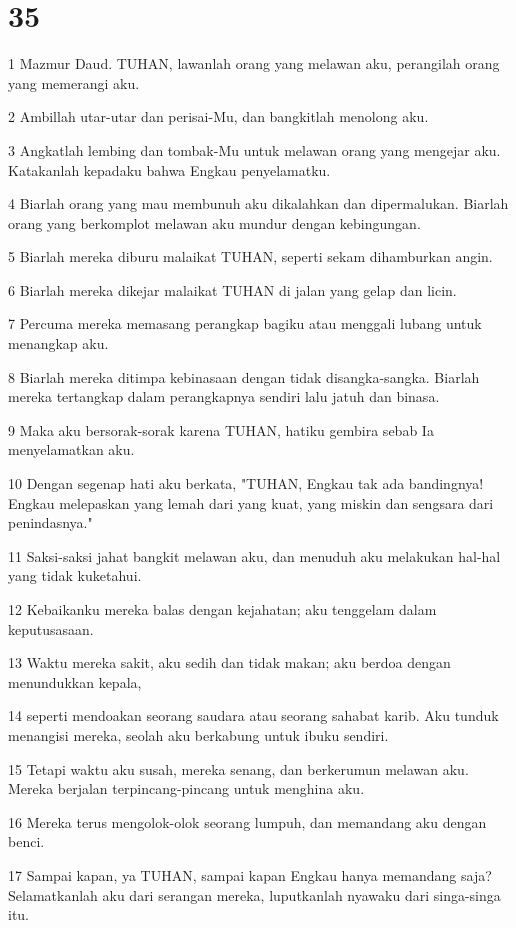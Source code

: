 \chapter{35}

\par 1 Mazmur Daud. TUHAN, lawanlah orang yang melawan aku, perangilah orang yang memerangi aku.
\par 2 Ambillah utar-utar dan perisai-Mu, dan bangkitlah menolong aku.
\par 3 Angkatlah lembing dan tombak-Mu untuk melawan orang yang mengejar aku. Katakanlah kepadaku bahwa Engkau penyelamatku.
\par 4 Biarlah orang yang mau membunuh aku dikalahkan dan dipermalukan. Biarlah orang yang berkomplot melawan aku mundur dengan kebingungan.
\par 5 Biarlah mereka diburu malaikat TUHAN, seperti sekam dihamburkan angin.
\par 6 Biarlah mereka dikejar malaikat TUHAN di jalan yang gelap dan licin.
\par 7 Percuma mereka memasang perangkap bagiku atau menggali lubang untuk menangkap aku.
\par 8 Biarlah mereka ditimpa kebinasaan dengan tidak disangka-sangka. Biarlah mereka tertangkap dalam perangkapnya sendiri lalu jatuh dan binasa.
\par 9 Maka aku bersorak-sorak karena TUHAN, hatiku gembira sebab Ia menyelamatkan aku.
\par 10 Dengan segenap hati aku berkata, "TUHAN, Engkau tak ada bandingnya! Engkau melepaskan yang lemah dari yang kuat, yang miskin dan sengsara dari penindasnya."
\par 11 Saksi-saksi jahat bangkit melawan aku, dan menuduh aku melakukan hal-hal yang tidak kuketahui.
\par 12 Kebaikanku mereka balas dengan kejahatan; aku tenggelam dalam keputusasaan.
\par 13 Waktu mereka sakit, aku sedih dan tidak makan; aku berdoa dengan menundukkan kepala,
\par 14 seperti mendoakan seorang saudara atau seorang sahabat karib. Aku tunduk menangisi mereka, seolah aku berkabung untuk ibuku sendiri.
\par 15 Tetapi waktu aku susah, mereka senang, dan berkerumun melawan aku. Mereka berjalan terpincang-pincang untuk menghina aku.
\par 16 Mereka terus mengolok-olok seorang lumpuh, dan memandang aku dengan benci.
\par 17 Sampai kapan, ya TUHAN, sampai kapan Engkau hanya memandang saja? Selamatkanlah aku dari serangan mereka, luputkanlah nyawaku dari singa-singa itu.
